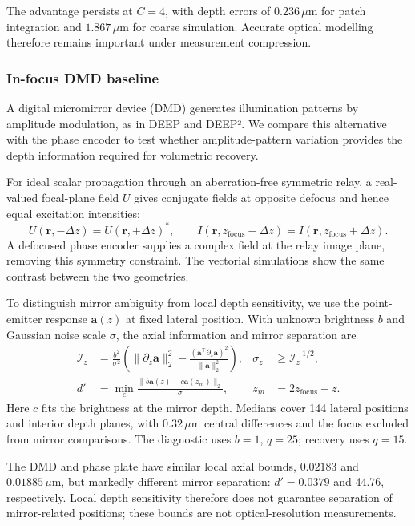 The advantage persists at \(C=4\), with depth errors of \(0.236\,\mu\mathrm m\) for patch integration and \(1.867\,\mu\mathrm m\) for coarse simulation. Accurate optical modelling therefore remains important under measurement compression.

\subsubsection{In-focus DMD baseline}

A digital micromirror device (DMD) generates illumination patterns by amplitude modulation, as in DEEP and DEEP². We compare this alternative with the phase encoder to test whether amplitude-pattern variation provides the depth information required for volumetric recovery.

For ideal scalar propagation through an aberration-free symmetric relay, a real-valued focal-plane field \(U\) gives conjugate fields at opposite defocus and hence equal excitation intensities:
\[
U(\mathbf r,-\Delta z)=U(\mathbf r,+\Delta z)^*,\qquad
I(\mathbf r,z_{\mathrm{focus}}-\Delta z)
=I(\mathbf r,z_{\mathrm{focus}}+\Delta z).
\]
A defocused phase encoder supplies a complex field at the relay image plane, removing this symmetry constraint. The vectorial simulations show the same contrast between the two geometries.

To distinguish mirror ambiguity from local depth sensitivity, we use the point-emitter response \(\mathbf a(z)\) at fixed lateral position. With unknown brightness \(b\) and Gaussian noise scale \(\sigma\), the axial information and mirror separation are
\[
\begin{aligned}
\mathcal I_z&=\frac{b^2}{\sigma^2}
\left(\|\partial_z\mathbf a\|_2^2-
\frac{(\mathbf a^\top\partial_z\mathbf a)^2}{\|\mathbf a\|_2^2}\right),
&\sigma_z&\geq\mathcal I_z^{-1/2},\\
d'&=\min_c\frac{\|b\mathbf a(z)-c\mathbf a(z_m)\|_2}{\sigma},
&z_m&=2z_{\mathrm{focus}}-z .
\end{aligned}
\tag{9}
\]
Here \(c\) fits the brightness at the mirror depth. Medians cover 144 lateral positions and interior depth planes, with \(0.32\,\mu\mathrm m\) central differences and the focus excluded from mirror comparisons. The diagnostic uses \(b=1\), \(q=25\); recovery uses \(q=15\).

The DMD and phase plate have similar local axial bounds, \(0.02183\) and \(0.01885\,\mu\mathrm m\), but markedly different mirror separation: \(d'=0.0379\) and 44.76, respectively. Local depth sensitivity therefore does not guarantee separation of mirror-related positions; these bounds are not optical-resolution measurements.

